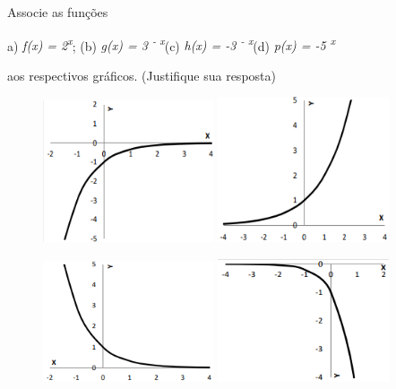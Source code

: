 \begin{texemplo}
Associe as funções 

a) \textit{f(x) = 2\textsuperscript{x}}; (b)  \textit{g(x) = 3\textsuperscript{ - x}}(c)  \textit{h(x) = -3\textsuperscript{ - x}}(d)  \textit{p(x) = -5 \textsuperscript{x}}

 aos respectivos gráficos. (Justifique sua resposta)

\begin{figure}[H]
    \includegraphics[width=0.45\textwidth]{capitulos/potencias_e_funcoes_exponenciais/media/image11.png} 
    \includegraphics[width=0.45\textwidth]{capitulos/potencias_e_funcoes_exponenciais/media/image12.png}
\end{figure}

\begin{figure}[H]
    \includegraphics[width=0.45\textwidth]{capitulos/potencias_e_funcoes_exponenciais/media/image13.png} 
    \includegraphics[width=0.45\textwidth]{capitulos/potencias_e_funcoes_exponenciais/media/image14.png}
\end{figure}


\end{texemplo}
